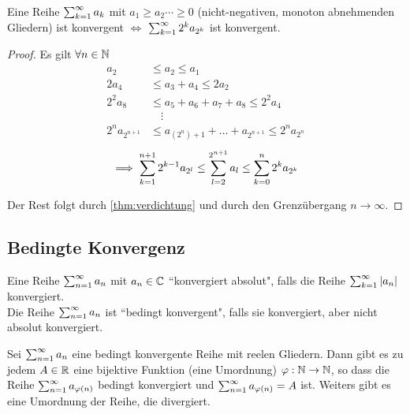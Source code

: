 \setcounter{thm}{15}
\begin{thm}[Verdichtung]
	\label{thm:verdichtung}
	Eine Reihe $\sum_{k=1}^{\infty} a_k$ mit $a_1 \geq a_2 \cdots \geq 0$ (nicht-negativen, monoton abnehmenden Gliedern) ist konvergent $\iff$ $\sum_{k=1}^{\infty} 2^k a_{2^k}$ ist konvergent.
\end{thm}
\begin{proof}
	Es gilt $\forall n\in \mathbb{N}$
	\begin{equation}
		\begin{aligned}
			a_2    &\leq a_2 \leq a_1 \\
			2a_4   &\leq a_3+a_4 \leq 2a_2 \\
			2^2a_8 &\leq a_5+a_6+a_7+a_8 \leq 2^2a_4 \\
			       &\quad \vdots \\
			2^{n} a_{2^{n+1}} & \leq a_{(2^n)+1} + \ldots + a_{2^{n+1}} \leq 2^n a_{2^n}
		\end{aligned}
	\end{equation}
	\begin{equation}
		\implies \sum_{k=1}^{n+1} 2^{k-1} a_{2^l} \leq \sum_{l=2}^{2^{n+1}} a_l \leq \sum_{k=0}^{n} 2^{k}a_{2^k}
	\end{equation}
	
	Der Rest folgt durch \autoref{thm:verdichtung} und durch den Grenzübergang $n \to \infty$.
\end{proof}


\subsection{Bedingte Konvergenz}
\begin{mydef}
	Eine Reihe $\sum_{n=1}^{\infty} a_n$ mit $a_n \in \mathbb{C}$ ``konvergiert absolut", falls die Reihe $\sum_{k=1}^{\infty} |a_n|$ konvergiert. \\
Die Reihe $\sum_{n=1}^{\infty} a_n$ ist ``bedingt konvergent", falls sie konvergiert, aber nicht absolut konvergiert.
\end{mydef}

\setcounter{thm}{20}
\begin{thm}
	Sei $\sum_{n=1}^{\infty} a_n$ eine bedingt konvergente Reihe mit reelen Gliedern. Dann gibt es zu jedem $A\in \mathbb{R}$ eine bijektive Funktion (eine Umordnung) $\varphi: \mathbb{N} \to \mathbb{N}$, so dass die Reihe $\sum_{n=1}^{\infty} a_{\varphi(n)}$ bedingt konvergiert und $\sum_{n=1}^{\infty} a_{\varphi(n)} = A$ ist. Weiters gibt es eine Umordnung der Reihe, die divergiert.	
\end{thm}


